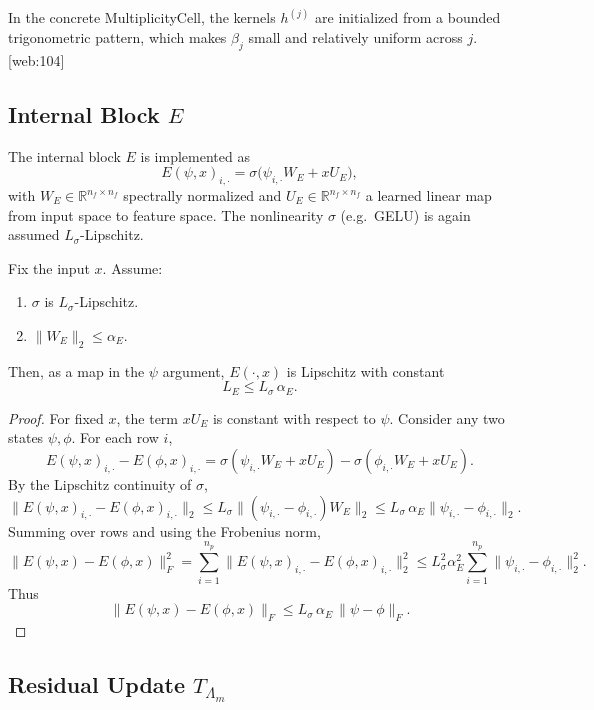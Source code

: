 \documentclass[11pt]{article}
\theoremstyle{definition}
\theoremstyle{plain}
\begin{document}
In the concrete MultiplicityCell, the kernels $h^{(j)}$ are initialized from a bounded trigonometric pattern, which makes $\beta_j$ small and relatively uniform across $j$.[web:104]

\subsection{Internal Block $E$}

The internal block $E$ is implemented as
\[
  E(\psi,x)_{i,\cdot} = \sigma\!\bigl(\psi_{i,\cdot} W_E + x U_E\bigr),
\]
with $W_E \in \mathbb{R}^{n_f \times n_f}$ spectrally normalized and $U_E \in \mathbb{R}^{n_f \times n_f}$ a learned linear map from input space to feature space.
The nonlinearity $\sigma$ (e.g.\ GELU) is again assumed $L_\sigma$-Lipschitz.

\begin{lemma}\label{lem:L_E}
Fix the input $x$.
Assume:
\begin{enumerate}
  \item $\sigma$ is $L_\sigma$-Lipschitz.
  \item $\|W_E\|_2 \le \alpha_E$.
\end{enumerate}
Then, as a map in the $\psi$ argument, $E(\cdot,x)$ is Lipschitz with constant
\[
  L_E \le L_\sigma \,\alpha_E.
\]
\end{lemma}

\begin{proof}
For fixed $x$, the term $x U_E$ is constant with respect to $\psi$.
Consider any two states $\psi,\phi$.
For each row $i$,
\[
  E(\psi,x)_{i,\cdot} - E(\phi,x)_{i,\cdot}
  = \sigma(\psi_{i,\cdot}W_E + x U_E) - \sigma(\phi_{i,\cdot}W_E + x U_E).
\]
By the Lipschitz continuity of $\sigma$,
\[
  \|E(\psi,x)_{i,\cdot} - E(\phi,x)_{i,\cdot}\|_2
  \le L_\sigma \|(\psi_{i,\cdot} - \phi_{i,\cdot}) W_E\|_2
  \le L_\sigma \,\alpha_E \|\psi_{i,\cdot} - \phi_{i,\cdot}\|_2.
\]
Summing over rows and using the Frobenius norm,
\[
  \|E(\psi,x) - E(\phi,x)\|_F^2
  = \sum_{i=1}^{n_p} \|E(\psi,x)_{i,\cdot} - E(\phi,x)_{i,\cdot}\|_2^2
  \le L_\sigma^2 \alpha_E^2 \sum_{i=1}^{n_p}\|\psi_{i,\cdot} - \phi_{i,\cdot}\|_2^2.
\]
Thus
\[
  \|E(\psi,x) - E(\phi,x)\|_F \le L_\sigma \,\alpha_E\,\|\psi - \phi\|_F.
\]
\end{proof}

\subsection{Residual Update $T_{\Lambda_m}$}
\end{document}
